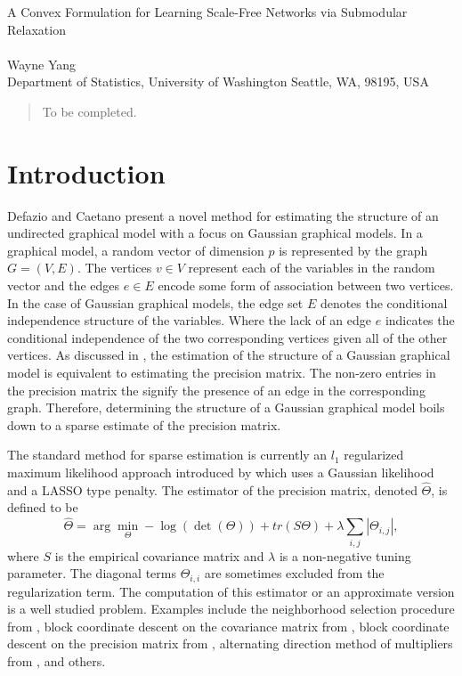 \documentclass{uwstat572}
\begin{document}

\begin{center}
  {\LARGE A Convex Formulation for Learning Scale-Free Networks via Submodular Relaxation}\\\ \\
  {Wayne Yang \\ 
    Department of Statistics, University of Washington Seattle, WA, 98195, USA
  }
\end{center}



\begin{abstract}
  To be completed.
\end{abstract}

\section{Introduction}
Defazio and Caetano present a novel method for estimating the structure of an undirected graphical model with a focus on Gaussian graphical models. In a graphical model, a random vector of dimension $p$ is represented by the graph $G = (V,E)$.  The vertices $v \in V$ represent each of the variables in the random vector and the edges $e \in E$ encode some form of association between two vertices. In the case of Gaussian graphical models, the edge set $E$ denotes the conditional independence structure of the variables.  Where the lack of an edge $e$ indicates the conditional independence of the two corresponding vertices given all of the other vertices.  As discussed in \cite{dempster}, the estimation of the structure of a Gaussian graphical model is equivalent to estimating the precision matrix.  The non-zero entries in the precision matrix the  signify the presence of an edge in the corresponding graph.  Therefore, determining the structure of a Gaussian graphical model boils down to a sparse estimate of the precision matrix.

The standard method for sparse estimation is currently an $l_1$ regularized maximum likelihood approach introduced by \cite{Yuan2007} which uses a Gaussian likelihood and a LASSO type penalty.  The estimator of the precision matrix, denoted $\widehat{\Theta}$, is defined to be
\begin{equation}
    \widehat{\Theta} = \arg\min_{\Theta} -\log( \det( \Theta)) + tr(S \Theta) + \lambda \sum_{i, j} |\Theta_{i,j}|,
\end{equation}
where $S$ is the empirical covariance matrix and $\lambda$ is a non-negative tuning parameter. The diagonal terms $\Theta_{i,i}$ are sometimes excluded from the regularization term. The computation of this estimator or an approximate version is a well studied problem.  Examples include the neighborhood selection procedure from \cite{meinshausen2006}, block coordinate descent on the covariance matrix from \cite{Banerjee2008}, block coordinate descent on the precision matrix from \cite{Friedman2008}, alternating direction method of multipliers from \cite{Boyd2011}, and others.
\end{document}
